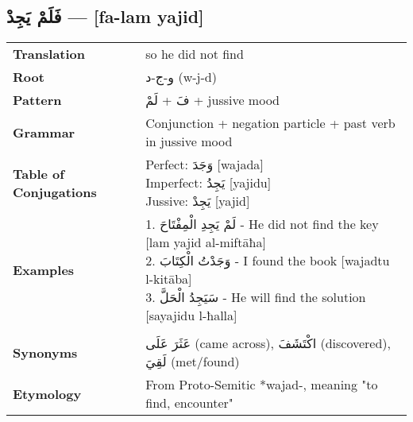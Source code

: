 \documentclass[letterpaper,12pt]{article}
\begin{document}
\subsection{\textarabic{فَلَمْ يَجِدْ} — [fa-lam yajid]}
\begin{tabular}{p{3cm}p{10cm}}
\toprule

\textbf{Translation} & so he did not find \\
\textbf{Root} & \textarabic{و-ج-د} (w-j-d) \\
\textbf{Pattern} & \textarabic{فَ} + \textarabic{لَمْ} + jussive mood \\
\textbf{Grammar} & Conjunction + negation particle + past verb in jussive mood \\
\textbf{Table of Conjugations} & \makecell[l]{
Perfect: \textarabic{وَجَدَ} [wajada]\\
Imperfect: \textarabic{يَجِدُ} [yajidu]\\
Jussive: \textarabic{يَجِدْ} [yajid]
} \\
\textbf{Examples} & \makecell[l]{\parbox{9.5cm}{
1. \textarabic{لَمْ يَجِدِ الْمِفْتَاحَ} - He did not find the key [lam yajid al-miftāħa]\\
2. \textarabic{وَجَدْتُ الْكِتَابَ} - I found the book [wajadtu l-kitāba]\\
3. \textarabic{سَيَجِدُ الْحَلَّ} - He will find the solution [sayajidu l-ħalla]
}} \\
\midrule \\
\textbf{Synonyms} & \textarabic{عَثَرَ عَلَى} (came across), \textarabic{اكْتَشَفَ} (discovered), \textarabic{لَقِيَ} (met/found) \\
\textbf{Etymology} & From Proto-Semitic *wajad-, meaning "to find, encounter" \\
\bottomrule
\end{tabular}
\end{document}
